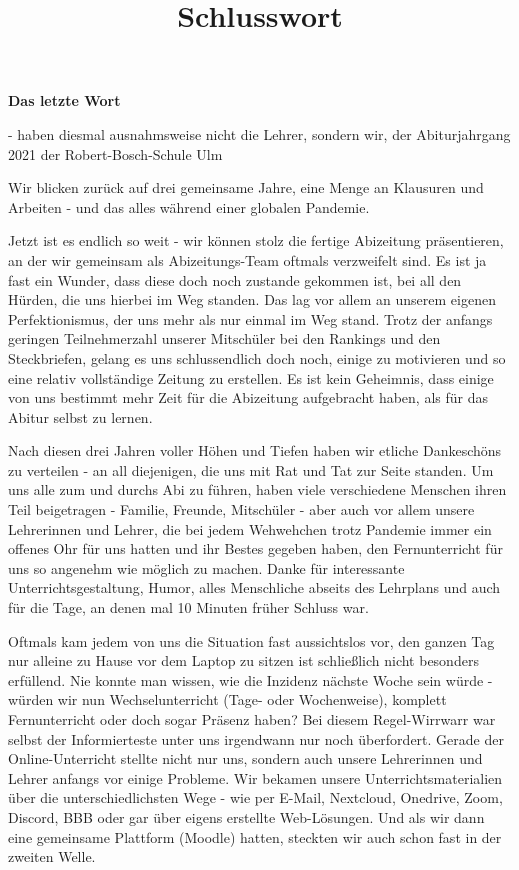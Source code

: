 \title{Schlusswort}

{
\large
\setlength{\parskip}{\baselineskip}

\begin{center}
\textbf{Das letzte Wort}

- haben diesmal ausnahmsweise nicht die Lehrer, sondern wir, der Abiturjahrgang 2021 der Robert-Bosch-Schule Ulm
\end{center}

Wir blicken zurück auf drei gemeinsame Jahre, eine Menge an Klausuren und Arbeiten - und das alles während einer globalen Pandemie.

Jetzt ist es endlich so weit - wir können stolz die fertige Abizeitung präsentieren, an der wir gemeinsam als Abizeitungs-Team oftmals verzweifelt sind. Es ist ja fast ein Wunder, dass diese doch noch zustande gekommen ist, bei all den Hürden, die uns hierbei im Weg standen. Das lag vor allem an unserem eigenen Perfektionismus, der uns mehr als nur einmal im Weg stand. Trotz der anfangs geringen Teilnehmerzahl unserer Mitschüler bei den Rankings und den Steckbriefen, gelang es uns schlussendlich doch noch, einige zu motivieren und so eine relativ vollständige Zeitung zu erstellen. Es ist kein Geheimnis, dass einige von uns bestimmt mehr Zeit für die Abizeitung aufgebracht haben, als für das Abitur selbst zu lernen.

Nach diesen drei Jahren voller Höhen und Tiefen haben wir etliche Dankeschöns zu verteilen - an all diejenigen, die uns mit Rat und Tat zur Seite standen. Um uns alle zum und durchs Abi zu führen, haben viele verschiedene Menschen ihren Teil beigetragen - Familie, Freunde, Mitschüler - aber auch vor allem unsere Lehrerinnen und Lehrer, die bei jedem Wehwehchen trotz Pandemie immer ein offenes Ohr für uns hatten und ihr Bestes gegeben haben, den Fernunterricht für uns so angenehm wie möglich zu machen. Danke für interessante Unterrichtsgestaltung, Humor, alles Menschliche abseits des Lehrplans und auch für die Tage, an denen mal 10 Minuten früher Schluss war.

Oftmals kam jedem von uns die Situation fast aussichtslos vor, den ganzen Tag nur alleine zu Hause vor dem Laptop zu sitzen ist schließlich nicht besonders erfüllend. Nie konnte man wissen, wie die Inzidenz nächste Woche sein würde - würden wir nun Wechselunterricht (Tage- oder Wochenweise), komplett Fernunterricht oder doch sogar Präsenz haben? Bei diesem Regel-Wirrwarr war selbst der Informierteste unter uns irgendwann nur noch überfordert.  Gerade der Online-Unterricht stellte nicht nur uns, sondern auch unsere Lehrerinnen und Lehrer anfangs vor einige Probleme. Wir bekamen unsere Unterrichtsmaterialien über die unterschiedlichsten Wege - wie per E-Mail, Nextcloud, Onedrive, Zoom, Discord, BBB oder gar über eigens erstellte Web-Lösungen. Und als wir dann eine gemeinsame Plattform (Moodle) hatten, steckten wir auch schon fast in der zweiten Welle.

}
